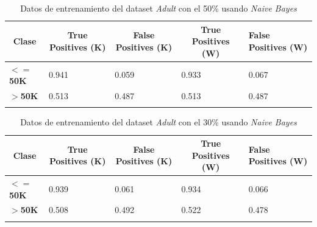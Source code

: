 \documentclass[10pt,a4paper]{article}
\begin{document}
\begin{table}[h]
\begin{tabular}{lllll}
\hline
\multicolumn{1}{|c|}{\textbf{Clase}} & \multicolumn{1}{c|}{\textbf{True Positives (K)}} & \multicolumn{1}{c|}{\textbf{False Positives (K)}} & \multicolumn{1}{c|}{\textbf{True Positives (W)}} & \multicolumn{1}{l|}{\textbf{False Positives (W)}} \\ \hline
\multicolumn{1}{|l|}{\textbf{$<=$50K}} & \multicolumn{1}{l|}{0.941}          & \multicolumn{1}{l|}{0.059}          & \multicolumn{1}{l|}{0.933}          & \multicolumn{1}{l|}{0.067} \\ \hline
\multicolumn{1}{|l|}{\textbf{$>$50K}} & \multicolumn{1}{l|}{0.513}          & \multicolumn{1}{l|}{0.487}          & \multicolumn{1}{l|}{0.513}          & \multicolumn{1}{l|}{0.487} \\ \hline
\textbf{}                       &                                &                                &                                &                      
\end{tabular}
\caption{Datos de entrenamiento del dataset \emph{Adult} con el 50\% usando \emph{Naive Bayes}}
\label{tab:adult_bayes_50}
\end{table}

\begin{table}[h!]
\begin{tabular}{lllll}
\hline
\multicolumn{1}{|c|}{\textbf{Clase}} & \multicolumn{1}{c|}{\textbf{True Positives (K)}} & \multicolumn{1}{c|}{\textbf{False Positives (K)}} & \multicolumn{1}{c|}{\textbf{True Positives (W)}} & \multicolumn{1}{l|}{\textbf{False Positives (W)}} \\ \hline
\multicolumn{1}{|l|}{\textbf{$<=$50K}} & \multicolumn{1}{l|}{0.939}          & \multicolumn{1}{l|}{0.061}          & \multicolumn{1}{l|}{0.934}          & \multicolumn{1}{l|}{0.066} \\ \hline
\multicolumn{1}{|l|}{\textbf{$>$50K}} & \multicolumn{1}{l|}{0.508}          & \multicolumn{1}{l|}{0.492}          & \multicolumn{1}{l|}{0.522}          & \multicolumn{1}{l|}{0.478} \\ \hline
\textbf{}                       &                                &                                &                                &                      
\end{tabular}
\caption{Datos de entrenamiento del dataset \emph{Adult} con el 30\% usando \emph{Naive Bayes}}
\label{tab:adult_bayes_30}
\end{table}
\end{document}
